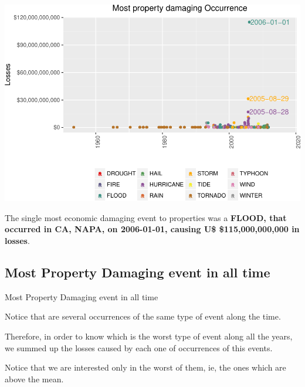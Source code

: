\documentclass[]{article}
\begin{document}
\includegraphics{readme_files/figure-latex/prop-single-plot-1.pdf}

The single most economic damaging event to properties was a
\textbf{FLOOD, that occurred in CA, NAPA, on 2006-01-01, causing U\$
\$115,000,000,000 in losses}.

\subsection{Most Property Damaging event in all
time}\label{most-property-damaging-event-in-all-time}

Most Property Damaging event in all time

Notice that are several occurrences of the same type of event along the
time.

Therefore, in order to know which is the worst type of event along all
the years, we summed up the losses caused by each one of occurrences of
this events.

Notice that we are interested only in the worst of them, ie, the ones
which are above the mean.
\end{document}
